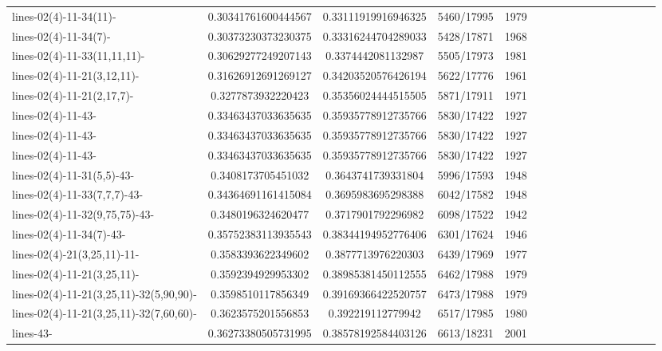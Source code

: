\documentclass[12pt]{report}			%
\begin{document}
\begin{landscape}
\begin{longtable}{ | p{5cm} | *{15}{c|}}
lines-02(4)-11-34(11)-                            & 0.30341761600444567 & 0.33111919916946325 & 5460/17995  & 1979 \\
lines-02(4)-11-34(7)-                             & 0.30373230373230375 & 0.33316244704289033 & 5428/17871  & 1968 \\
lines-02(4)-11-33(11,11,11)-                       & 0.30629277249207143 & 0.3374442081132987  & 5505/17973  & 1981 \\
lines-02(4)-11-21(3,12,11)-                       & 0.31626912691269127 & 0.34203520576426194 & 5622/17776  & 1961 \\
lines-02(4)-11-21(2,17,7)-                        & 0.3277873932220423  & 0.35356024444515505 & 5871/17911  & 1971 \\
lines-02(4)-11-43-                                & 0.33463437033635635 & 0.35935778912735766 & 5830/17422  & 1927 \\
lines-02(4)-11-43-                                & 0.33463437033635635 & 0.35935778912735766 & 5830/17422  & 1927 \\
lines-02(4)-11-43-                                & 0.33463437033635635 & 0.35935778912735766 & 5830/17422  & 1927 \\
lines-02(4)-11-31(5,5)-43-                        & 0.3408173705451032  & 0.3643741739331804  & 5996/17593  & 1948 \\
lines-02(4)-11-33(7,7,7)-43-                     & 0.34364691161415084 & 0.3695983695298388  & 6042/17582  & 1948 \\
lines-02(4)-11-32(9,75,75)-43-                    & 0.3480196324620477  & 0.3717901792296982  & 6098/17522  & 1942 \\
lines-02(4)-11-34(7)-43-                          & 0.35752383113935543 & 0.38344194952776406 & 6301/17624  & 1946 \\
lines-02(4)-21(3,25,11)-11-                       & 0.3583393622349602  & 0.3877713976220303  & 6439/17969  & 1977 \\
lines-02(4)-11-21(3,25,11)-                       & 0.3592394929953302  & 0.38985381450112555 & 6462/17988  & 1979 \\
lines-02(4)-11-21(3,25,11)-32(5,90,90)-           & 0.3598510117856349  & 0.39169366422520757 & 6473/17988  & 1979 \\
lines-02(4)-11-21(3,25,11)-32(7,60,60)-           & 0.3623575201556853  & 0.392219112779942   & 6517/17985  & 1980 \\
lines-43-                                         & 0.36273380505731995 & 0.38578192584403126 & 6613/18231  & 2001 \\

\end{longtable}
\end{landscape}
\end{document}
